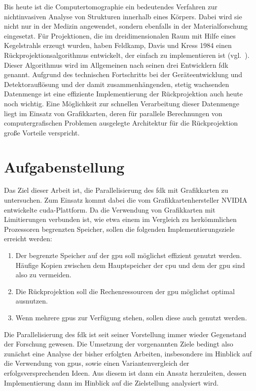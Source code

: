 Bis heute ist die Computertomographie ein bedeutendes Verfahren zur nichtinvasiven Analyse von Strukturen innerhalb
eines Körpers. Dabei wird sie nicht nur in der Medizin angewendet, sondern ebenfalls in der Materialforschung
eingesetzt. Für Projektionen, die im dreidimensionalen Raum mit Hilfe eines Kegelstrahls erzeugt wurden, haben Feldkamp,
Davis und Kress 1984 einen Rückprojektionsalgorithmus entwickelt, der einfach zu implementieren ist (vgl.~\cite{fdk}).
Dieser Algorithmus wird im Allgemeinen nach seinen drei Entwicklern \gls{fdk} genannt. Aufgrund des technischen
Fortschritts bei der Geräteentwicklung und Detektorauflösung und der damit zusammenhängenden, stetig wachsenden
Datenmenge ist eine effiziente Implementierung der Rückprojektion auch heute noch wichtig. Eine Möglichkeit zur
schnellen Verarbeitung dieser Datenmenge liegt im Einsatz von Grafikkarten, deren für parallele Berechnungen von
computergrafischen Problemen ausgelegte Architektur für die Rückprojektion große Vorteile verspricht.

\section{Aufgabenstellung}\label{intro:aufgabenstellung}

Das Ziel dieser Arbeit ist, die Parallelisierung des \gls{fdk} mit Grafikkarten zu untersuchen. Zum Einsatz kommt dabei
die vom Grafikkartenhersteller NVIDIA entwickelte \gls{cuda}-Plattform. Da die Verwendung von Grafikkarten mit
Limitierungen verbunden ist, wie etwa einem im Vergleich zu herkömmlichen Prozessoren begrenzten Speicher, sollen die
folgenden Implementierungsziele erreicht werden:

\begin{enumerate}
    \item Der begrenzte Speicher auf der \gls{gpu} soll möglichst effizient genutzt werden. Häufige Kopien zwischen dem
          Hauptspeicher der \gls{cpu} und dem der \gls{gpu} sind also zu vermeiden.
    \item Die Rückprojektion soll die Rechenressourcen der \gls{gpu} möglichst optimal ausnutzen.
    \item Wenn mehrere \gls{gpu}s zur Verfügung stehen, sollen diese auch genutzt werden.
\end{enumerate}

Die Parallelisierung des \gls{fdk} ist seit seiner Vorstellung immer wieder Gegenstand der Forschung gewesen. Die
Umsetzung der vorgenannten Ziele bedingt also zunächst eine Analyse der bisher erfolgten Arbeiten, insbesondere im
Hinblick auf die Verwendung von \gls{gpu}s, sowie einen Variantenvergleich der erfolgsversprechenden Ideen. Aus diesem
ist dann ein Ansatz herzuleiten, dessen Implementierung dann im Hinblick auf die Zielstellung analysiert wird.
